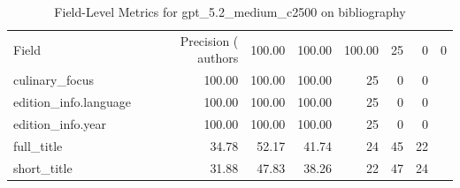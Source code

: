 \begin{table}
\caption{Field-Level Metrics for gpt_5.2_medium_c2500 on bibliography}
\label{tab:fields_gpt_5.2_medium_c2500_bibliography}
\begin{tabular}{lrrrrrr}
\toprule
Field & Precision (%
\midrule
authors & 100.00 & 100.00 & 100.00 & 25 & 0 & 0 \\
culinary_focus & 100.00 & 100.00 & 100.00 & 25 & 0 & 0 \\
edition_info.language & 100.00 & 100.00 & 100.00 & 25 & 0 & 0 \\
edition_info.year & 100.00 & 100.00 & 100.00 & 25 & 0 & 0 \\
full_title & 34.78 & 52.17 & 41.74 & 24 & 45 & 22 \\
short_title & 31.88 & 47.83 & 38.26 & 22 & 47 & 24 \\
\bottomrule
\end{tabular}
\end{table}
